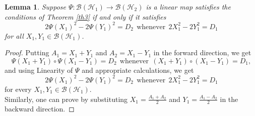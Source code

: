 \documentclass{amsart}
\newtheorem{lemma}[theorem]{Lemma}
\theoremstyle{definition}
\theoremstyle{remark}
\numberwithin{equation}{section}
\begin{document}
\begin{lemma}
	\label{lem2}
	Suppose $\Psi: \mathscr{B}(\mathscr{H}_1) \to \mathscr{B}(\mathscr{H}_2)$ is a linear map satisfies the conditions of Theorem \ref{th3} if and only if it satisfies
    \begin{equation}
        \label{eq2}
        2 \Psi(X_1)^2-2\Psi(Y_1)^2=D_2~~\text{whenever}~~2X_1^2-2Y_1^2=D_1
    \end{equation}
    for all $X_1, Y_1 \in \mathscr{B}(\mathscr{H}_1)$.
\end{lemma}
\begin{proof}
	Putting $A_1=X_1+Y_1$ and $A_2=X_1-Y_1$ in the forward direction, we get
	$$\Psi(X_1+Y_1) \circ \Psi(X_1-Y_1)=D_2 ~~\text{whenever}~~ (X_1+Y_1) \circ (X_1-Y_1)=D_1,$$ and using Linearity of $\Psi$ and appropriate calculations, we get $$ 2 \Psi(X_1)^2-2\Psi(Y_1)^2=D_2 ~~\text{whenever}~~2X_1^2-2Y_1^2=D_1$$ for every $X_1, Y_1 \in \mathscr{B}(\mathscr{H}_1)$.\\
    Similarly, one can prove by substituting $X_1=\frac{A_1+A_2}{2}$ and $Y_1=\frac{A_1-A_2}{2}$ in the backward direction.
\end{proof}
\end{document}
